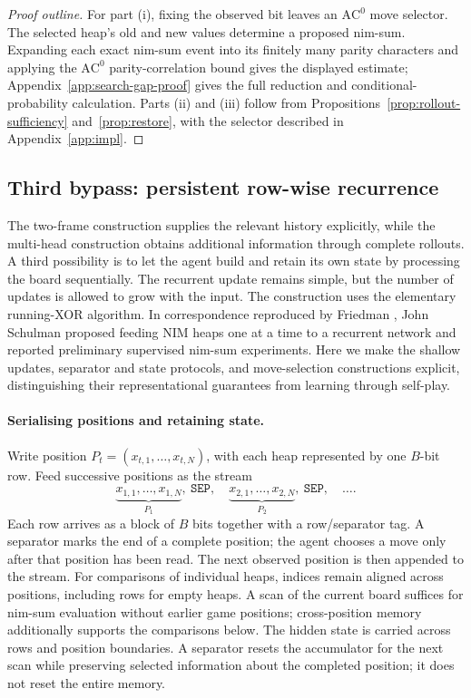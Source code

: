 \documentclass[twoside,11pt]{article}
\newcommand{\AC}{\mathrm{AC}}
\numberwithin{theorem}{section}
\numberwithin{equation}{section}
\begin{document}
\begin{proof}[Proof outline]
For part (i), fixing the observed bit leaves an $\AC^0$ move selector. The selected heap's old and new values determine a proposed nim-sum. Expanding each exact nim-sum event into its finitely many parity characters and applying the $\AC^0$ parity-correlation bound gives the displayed estimate; Appendix~\ref{app:search-gap-proof} gives the full reduction and conditional-probability calculation. Parts (ii) and (iii) follow from Propositions~\ref{prop:rollout-sufficiency} and~\ref{prop:restore}, with the selector described in Appendix~\ref{app:impl}.
\end{proof}


\subsection{Third bypass: persistent row-wise recurrence}
\label{sec:recurrent-bypass}

The two-frame construction supplies the relevant history explicitly, while the multi-head construction obtains additional information through complete rollouts. A third possibility is to let the agent build and retain its own state by processing the board sequentially. The recurrent update remains simple, but the number of updates is allowed to grow with the input. The construction uses the elementary running-XOR algorithm. In correspondence reproduced by Friedman \citep{friedman2017deeplearning}, John Schulman proposed feeding NIM heaps one at a time to a recurrent network and reported preliminary supervised nim-sum experiments. Here we make the shallow updates, separator and state protocols, and move-selection constructions explicit, distinguishing their representational guarantees from learning through self-play.

\paragraph{Serialising positions and retaining state.}
Write position $P_t=(x_{t,1},\ldots,x_{t,N})$, with each heap represented by one $B$-bit row. Feed successive positions as the stream
\[
\underbrace{x_{1,1},\ldots,x_{1,N}}_{P_1},\ \mathtt{SEP},\quad
\underbrace{x_{2,1},\ldots,x_{2,N}}_{P_2},\ \mathtt{SEP},\quad\ldots .
\]
Each row arrives as a block of $B$ bits together with a row/separator tag. A separator marks the end of a complete position; the agent chooses a move only after that position has been read. The next observed position is then appended to the stream. For comparisons of individual heaps, indices remain aligned across positions, including rows for empty heaps.
A scan of the current board suffices for nim-sum evaluation without earlier game positions; cross-position memory additionally supports the comparisons below. The hidden state is carried across rows and position boundaries. A separator resets the accumulator for the next scan while preserving selected information about the completed position; it does not reset the entire memory.
\end{document}
